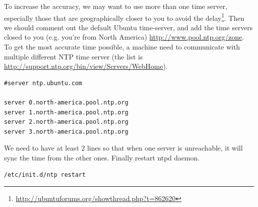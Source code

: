 To increase the accuracy, we may want to use more than one time server,
especially those that are geographically closer to you to avoid the
delay\footnote{\url{http://ubuntuforums.org/showthread.php?t=862620}}.
Then we should comment out the default Ubuntu time-server, and add the time
servers closed to you (e.g. you're from North America)
\url{http://www.pool.ntp.org/zone}.  To get the most accurate time possible, a
machine need to communicate with multiple different NTP time server (the list is
\url{http://support.ntp.org/bin/view/Servers/WebHome}).

\begin{verbatim}
#server ntp.ubuntu.com

server 0.north-america.pool.ntp.org
server 1.north-america.pool.ntp.org
server 2.north-america.pool.ntp.org
server 3.north-america.pool.ntp.org
\end{verbatim}
We need to have at least 2 lines so that when one server is unreachable, it will
sync the time from the other ones. Finally restart ntpd daemon.
\begin{verbatim}
/etc/init.d/ntp restart
\end{verbatim}

